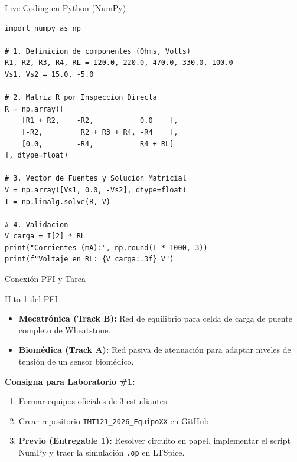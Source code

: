 \documentclass[aspectratio=169, 10pt]{beamer}
\begin{document}
\begin{frame}[fragile]{Live-Coding en Python (NumPy)}
\begin{lstlisting}
import numpy as np

# 1. Definicion de componentes (Ohms, Volts)
R1, R2, R3, R4, RL = 120.0, 220.0, 470.0, 330.0, 100.0
Vs1, Vs2 = 15.0, -5.0

# 2. Matriz R por Inspeccion Directa
R = np.array([
    [R1 + R2,    -R2,           0.0    ],
    [-R2,         R2 + R3 + R4, -R4    ],
    [0.0,        -R4,           R4 + RL]
], dtype=float)

# 3. Vector de Fuentes y Solucion Matricial
V = np.array([Vs1, 0.0, -Vs2], dtype=float)
I = np.linalg.solve(R, V)

# 4. Validacion
V_carga = I[2] * RL
print("Corrientes (mA):", np.round(I * 1000, 3))
print(f"Voltaje en RL: {V_carga:.3f} V")
\end{lstlisting}
\end{frame}

\begin{frame}{Conexión PFI y Tarea}
    \begin{block}{Hito 1 del PFI}
        \begin{itemize}
            \item \textbf{Mecatrónica (Track B):} Red de equilibrio para celda de carga de puente completo de Wheatstone.
            \item \textbf{Biomédica (Track A):} Red pasiva de atenuación para adaptar niveles de tensión de un sensor biomédico.
        \end{itemize}
    \end{block}
    
    \vspace{0.3cm}
    \textbf{Consigna para Laboratorio \#1:}
    \begin{enumerate}
        \item Formar equipos oficiales de 3 estudiantes.
        \item Crear repositorio \texttt{IMT121\_2026\_EquipoXX} en GitHub.
        \item \textbf{Previo (Entregable 1):} Resolver circuito en papel, implementar el script NumPy y traer la simulación \texttt{.op} en LTSpice.
    \end{enumerate}
\end{frame}
\end{document}
